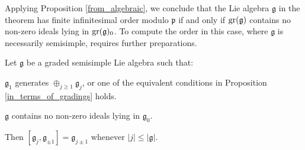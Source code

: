 \documentclass[leqno,12pt]{amsart} %
\begin{document}
Applying Proposition \ref{from_algebraic}, we conclude that the Lie algebra
${\mathfrak g} $ in the theorem has finite infinitesimal order modulo ${\mathfrak p} $ if
and only if $\operatorname{\operatorname{gr}}({\mathfrak g})$ contains no non-zero ideals lying in
$\operatorname{\operatorname{gr}}({\mathfrak g})_0$. To compute the order in this case, where ${\mathfrak g} $ is
necessarily semisimple, requires further preparations.

\begin{proposition}
  Let ${\mathfrak g} $ be a graded semisimple Lie algebra such that:
  \begin{conditions}
  \item\label{assumption1} ${\mathfrak g}_1$ generates $\oplus_{j\ge 1}{\mathfrak g}_j$,
    or one of the equivalent conditions in Proposition \ref{in_terms_of_gradings} holds.
  \item\label{assumption2} ${\mathfrak g}$ contains no non-zero ideals lying in
    ${\mathfrak g}_0$.
  \end{conditions}
  Then $[{\mathfrak g}_j, {\mathfrak g}_{\pm 1}]={\mathfrak g}_{j\pm 1}$ whenever
  $|j| \le |{\mathfrak g}|$.
\end{proposition}
\end{document}
